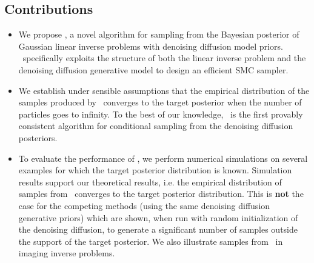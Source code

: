 \subsection*{Contributions} \begin{itemize}[wide, labelwidth=!, labelindent=0pt]
    \item We propose \algo, a novel algorithm for sampling from the Bayesian posterior of Gaussian linear inverse problems with denoising diffusion model priors. \algo\ specifically exploits the structure of both the linear inverse problem and the denoising diffusion generative model to design an efficient SMC sampler.
    \vspace{-.15cm}
    \item We establish under sensible assumptions that the empirical distribution of the samples produced by \algo\ converges to the target posterior when the number of particles goes to infinity. To the best of our knowledge, \algo\ is the first provably consistent algorithm for conditional sampling from the denoising diffusion posteriors. 
    \vspace{-.15cm}
    \item
    To evaluate the performance of \algo, we perform numerical simulations on several examples for which the target posterior distribution is known. Simulation results support our theoretical results, i.e. the empirical distribution of samples from \algo\ converges to the target posterior distribution. This is \textbf{not} the case for the competing methods (using the same denoising diffusion generative priors) which are shown, when run with random initialization of the denoising diffusion, to generate a significant number of samples outside the support of the target posterior.
    We also illustrate samples from \algo\ in imaging inverse problems.
\end{itemize}
